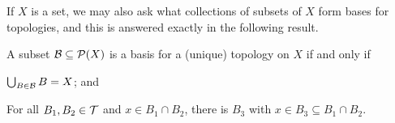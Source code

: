 \documentclass[11pt]{article}
\begin{document}
If $X$ is a set, we may also ask what collections of subsets of $X$ form bases for topologies, and this is answered exactly in the following result.
\begin{proposition}\label{basisprops}
    A subset $\mathcal{B} \subseteq \mathcal{P}(X)$ is a basis for a (unique) topology on $X$ if and only if
    \begin{enum}
        \item $\bigcup_{B \in \mathcal{B}}B = X$; and
        \item For all $B_1, B_2 \in \mathcal{T}$ and $x \in B_1 \cap B_2$, there is $B_3$ with $x \in B_3 \subseteq B_1 \cap B_2$.
    \end{enum}
\end{proposition}
\end{document}
